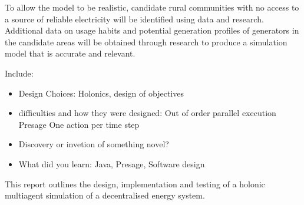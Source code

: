 To allow the model to be realistic, candidate rural communities with no access to a source of reliable electricity will be identified using data and research. Additional data on usage habits and potential generation profiles of generators in the candidate areas will be obtained through research to produce a simulation model that is accurate and relevant.

Include:
\begin{itemize}
	\item Design Choices: Holonics, design of objectives
	\item difficulties and how they were designed:
		\subitem Out of order parallel execution
		\subitem Presage
		\subitem One action per time step
	\item Discovery or invetion of something novel?
	\item What did you learn:
		\subitem Java, Presage, Software design
\end{itemize}


This report outlines the design, implementation and testing of a holonic multiagent simulation of a decentralised energy system. 
